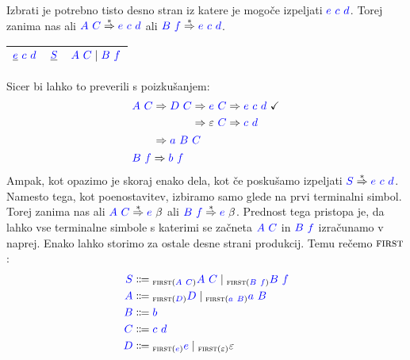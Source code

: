 \documentclass{article}
\newcommand{\FIRST}{\textsc{first}}
\newcommand{\OK}{\ \checkmark}
\newcommand{\Symbol}[1]{\textcolor{blue}{#1}}
\newcommand{\Null}{\varepsilon}
\newcommand{\Arrow}{\Coloneq}
\newcommand{\Derive}{\Rightarrow}
\newcommand{\DeriveStar}{\overset{\ast}{\Rightarrow}}
\newcommand{\Seq}{\ }
\newcommand{\Union}{\mathrel{|}}
\newcommand{\Lk}[1]{{}_{{#1}}}
\begin{document}
Izbrati je potrebno tisto desno stran iz katere je mogoče izpeljati $\Symbol{e} \Seq \Symbol{c} \Seq \Symbol{d}$.
Torej zanima nas ali $\Symbol{A} \Seq \Symbol{C} \DeriveStar \Symbol{e} \Seq \Symbol{c} \Seq \Symbol{d}$ ali $\Symbol{B} \Seq \Symbol{f} \DeriveStar \Symbol{e} \Seq \Symbol{c} \Seq \Symbol{d}$.
\begin{center}
\begin{tabular}{|c|c|c|}
  \hline
  $\underline{\Symbol{e}} \Seq \Symbol{c} \Seq \Symbol{d}$ & $\underline{\Symbol{S}}$ & $\Symbol{A} \Seq \Symbol{C} \Union \Symbol{B} \Seq \Symbol{f}$ \\ 
  \hline
\end{tabular}
\end{center}
Sicer bi lahko to preverili s poizkušanjem:
\begin{equation*}
  \begin{aligned}[t]
    &\Symbol{A} \Seq \Symbol{C} \begin{aligned}[t]
      &\Derive \Symbol{D} \Seq \Symbol{C} \begin{aligned}[t]
        &\Derive \Symbol{e} \Seq \Symbol{C} \Derive \Symbol{e} \Seq \Symbol{c} \Seq \Symbol{d} \OK\\
        &\Derive \Null \Seq \Symbol{C} \Derive \Symbol{c} \Seq \Symbol{d}
      \end{aligned}\\
      &\Derive \Symbol{a} \Seq \Symbol{B} \Seq \Symbol{C}
    \end{aligned}\\
    &\Symbol{B} \Seq \Symbol{f} \Derive \Symbol{b} \Seq \Symbol{f}
  \end{aligned}
\end{equation*}
Ampak, kot opazimo je skoraj enako dela, kot če poskušamo izpeljati $\Symbol{S} \DeriveStar \Symbol{e} \Seq \Symbol{c} \Seq \Symbol{d}$.
Namesto tega, kot poenostavitev, izbiramo samo glede na prvi terminalni simbol.
Torej zanima nas ali $\Symbol{A} \Seq \Symbol{C} \DeriveStar \Symbol{e} \Seq \beta$ ali $\Symbol{B} \Seq \Symbol{f} \DeriveStar \Symbol{e} \Seq \beta$.
Prednost tega pristopa je, da lahko vse terminalne simbole s katerimi se začneta $\Symbol{A} \Seq \Symbol{C}$ in $\Symbol{B} \Seq \Symbol{f}$ izračunamo v naprej.
Enako lahko storimo za ostale desne strani produkcij.
Temu rečemo $\FIRST$:
\begin{equation*}
  \begin{aligned}
    \Symbol{S} &\Arrow \Lk{\FIRST(\Symbol{A} \Seq \Symbol{C})} \Symbol{A} \Seq \Symbol{C} \Union \Lk{\FIRST(\Symbol{B} \Seq \Symbol{f})} \Symbol{B} \Seq \Symbol{f} \\
    \Symbol{A} &\Arrow \Lk{\FIRST(\Symbol{D})} \Symbol{D} \Union \Lk{\FIRST(\Symbol{a} \Seq \Symbol{B})} \Symbol{a} \Seq \Symbol{B} \\
    \Symbol{B} &\Arrow \Symbol{b}\\
    \Symbol{C} &\Arrow \Symbol{c} \Seq \Symbol{d}\\
    \Symbol{D} &\Arrow \Lk{\FIRST(\Symbol{e})} \Symbol{e} \Union \Lk{\FIRST(\Null)} \Null
  \end{aligned}
\end{equation*}
\end{document}
